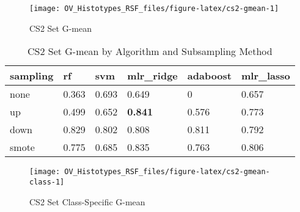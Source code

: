 \documentclass[
]{report}
\begin{document}
\begin{figure}[H]

{\centering \texttt{[image: OV\_Histotypes\_RSF\_files/figure-latex/cs2-gmean-1]} 

}

\caption{CS2 Set G-mean}\label{fig:cs2-gmean}
\end{figure}

\begin{table}

\caption{\label{tab:cs2-gmean-table}CS2 Set G-mean by Algorithm and Subsampling Method}
\centering
\begin{tabular}[t]{l|l|l|l|l|l}
\hline
sampling & rf & svm & mlr\_ridge & adaboost & mlr\_lasso\\
\hline
none & 0.363 & 0.693 & 0.649 & 0 & 0.657\\
\hline
up & 0.499 & 0.652 & \textbf{0.841} & 0.576 & 0.773\\
\hline
down & 0.829 & 0.802 & 0.808 & 0.811 & 0.792\\
\hline
smote & 0.775 & 0.685 & 0.835 & 0.763 & 0.806\\
\hline
\end{tabular}
\end{table}

\begin{figure}[H]

{\centering \texttt{[image: OV\_Histotypes\_RSF\_files/figure-latex/cs2-gmean-class-1]} 

}

\caption{CS2 Set Class-Specific G-mean}\label{fig:cs2-gmean-class}
\end{figure}
\end{document}
